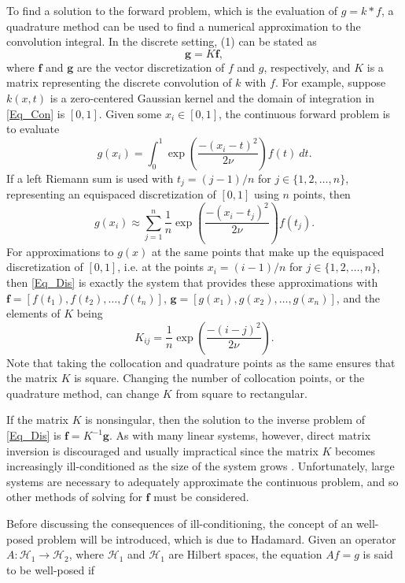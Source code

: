 \documentclass[12pt]{article}
\newcommand{\gcon}{g}
\newcommand{\kcon}{k}
\newcommand{\fcon}{f}
\newcommand{\blurV}{\nu}	%
\newcommand{\gdis}{\mathbf{g}}
\newcommand{\kmat}{K}	%
\newcommand{\fdis}{\mathbf{f}}
\begin{document}
To find a solution to the forward problem, which is the evaluation of $\gcon = \kcon * \fcon$, a quadrature method can be used to find a numerical approximation to the convolution integral. In the discrete setting, (1) can be stated as
\begin{equation}
\gdis = \kmat\fdis,
\label{Eq_Dis}
\end{equation}
where $\fdis$ and $\gdis$ are the vector discretization of $\fcon$ and $\gcon$, respectively, and $\kmat$ is a matrix representing the discrete convolution of $\kcon$ with $\fcon$. For example, suppose $\kcon(x,t)$ is a zero-centered Gaussian kernel and the domain of integration in \eqref{Eq_Con} is $[0,1]$. Given some $x_i \in [0,1]$, the continuous forward problem is to evaluate
\[g(x_i) = \int_0^1 \exp\left(\frac{-(x_i - t)^2}{2\blurV}\right)\fcon(t) \: dt.\]
If a left Riemann sum is used with $t_j = (j-1)/n$ for $j \in \{1,2,\ldots,n\}$, representing an equispaced discretization of $[0,1]$ using $n$ points, then
\[g(x_i) \approx \sum_{j=1}^n \frac{1}{n}\exp\left(\frac{-(x_i - t_j)^2}{2\blurV}\right)\fcon(t_j).\]
For approximations to $\gcon(x)$ at the same points that make up the equispaced discretization of $[0,1]$, i.e. at the points $x_i = (i-1)/n$ for $j \in \{1,2,\ldots,n\}$, then \eqref{Eq_Dis} is exactly the system that provides these approximations with $\fdis = [\fcon(t_1),\fcon(t_2),\ldots,\fcon(t_n)]$, $\gdis = [\gcon(x_1),\gcon(x_2),\ldots,\gcon(x_n)]$, and the elements of $\kmat$ being
\[K_{ij} = \frac{1}{n}\exp\left(\frac{-(i - j)^2}{2\blurV}\right).\]
Note that taking the collocation and quadrature points as the same ensures that the matrix $\kmat$ is square. Changing the number of collocation points, or the quadrature method, can change $\kmat$ from square to rectangular. \par
If the matrix $\kmat$ is nonsingular, then the solution to the inverse problem of \eqref{Eq_Dis} is $\fdis = \kmat^{-1}\gdis$. As with many linear systems, however, direct matrix inversion is discouraged and usually impractical since the matrix $\kmat$ becomes increasingly ill-conditioned as the size of the system grows \cite{Vogel:2002}. Unfortunately, large systems are necessary to adequately approximate the continuous problem, and so other methods of solving for $\fdis$ must be considered. \par
Before discussing the consequences of ill-conditioning, the concept of an well-posed problem will be introduced, which is due to Hadamard. Given an operator $A : \mathcal{H}_1 \rightarrow \mathcal{H}_2$, where $\mathcal{H}_1$ and $\mathcal{H}_1$ are Hilbert spaces, the equation $Af = g$ is said to be well-posed if
\end{document}
